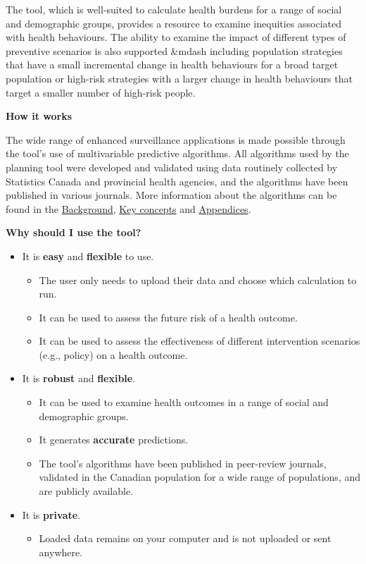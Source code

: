 \documentclass[]{book}
\providecommand{\tightlist}{%
  \setlength{\itemsep}{0pt}\setlength{\parskip}{0pt}}
\begin{document}
The tool, which is well-suited to calculate health burdens for a range
of social and demographic groups, provides a resource to examine
inequities associated with health behaviours.\citep{manuel2018} The
ability to examine the impact of different types of preventive scenarios
is also supported \&mdash including population strategies that have a
small incremental change in health behaviours for a broad target
population or high-risk strategies with a larger change in health
behaviours that target a smaller number of high-risk
people.\citep{PoRTover}

\textbf{How it works}

The wide range of enhanced surveillance applications is made possible
through the tool's use of multivariable predictive algorithms. All
algorithms used by the planning tool were developed and validated using
data routinely collected by Statistics Canada and provincial health
agencies, and the algorithms have been published in various journals.
More information about the algorithms can be found in the
\protect\hyperlink{background}{Background},
\protect\hyperlink{keyconcepts}{Key concepts} and
\protect\hyperlink{mport}{Appendices}.

\textbf{Why should I use the tool?}

\begin{itemize}
\item
  It is \textbf{easy} and \textbf{flexible} to use.

  \begin{itemize}
  \tightlist
  \item
    The user only needs to upload their data and choose which
    calculation to run.
  \item
    It can be used to assess the future risk of a health outcome.
  \item
    It can be used to assess the effectiveness of different intervention
    scenarios (e.g., policy) on a health outcome.
  \end{itemize}
\item
  It is \textbf{robust} and \textbf{flexible}.

  \begin{itemize}
  \tightlist
  \item
    It can be used to examine health outcomes in a range of social and
    demographic groups.
  \item
    It generates \textbf{accurate} predictions.
  \item
    The tool's algorithms have been published in peer-review journals,
    validated in the Canadian population for a wide range of
    populations, and are publicly available.
  \end{itemize}
\item
  It is \textbf{private}.

  \begin{itemize}
  \tightlist
  \item
    Loaded data remains on your computer and is not uploaded or sent
    anywhere.
  \end{itemize}
\end{itemize}
\end{document}
